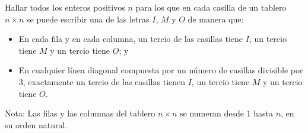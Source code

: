 Hallar todos los enteros positivos $n$ para los que en cada casilla de un tablero $n \times n$ se puede escribir una de las letras $I$, $M$ y $O$ de manera que: 
\begin{itemize}
\item En cada fila y en cada columna, un tercio de las casillas tiene $I$, un tercio tiene $M$ y un tercio tiene $O$; y 
\item En cualquier línea diagonal compuesta por un número de casillas divisible por $3$, exactamente un tercio de las casillas tienen $I$, un tercio tiene $M$ y un tercio tiene $O$.
\end{itemize}
Nota: Las filas y las columnas del tablero $n \times n$ se numeran desde $1$ hasta $n$, en su orden natural. 